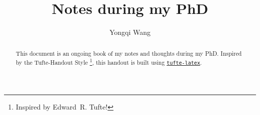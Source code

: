 \documentclass{tufte-handout}
\title{Notes during my PhD}
\author{Yongqi Wang}
\begin{document}
\maketitle%

\begin{abstract}
    \noindent
    This document is an ongoing book of my notes and thoughts during my PhD.
    Inspired by the Tufte-Handout Style \thanks{Inspired by Edward~R. Tufte!},
    this handout is built using \href{https://github.com/Tufte-LaTeX/tufte-latex}{\texttt{tufte-latex}}.
\end{abstract}






\end{document}
